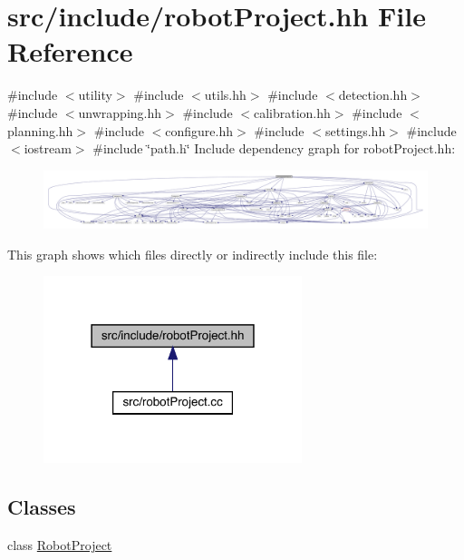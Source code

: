 \hypertarget{robot_project_8hh}{}\section{src/include/robot\+Project.hh File Reference}
\label{robot_project_8hh}
{\ttfamily \#include $<$utility$>$}\newline
{\ttfamily \#include $<$utils.\+hh$>$}\newline
{\ttfamily \#include $<$detection.\+hh$>$}\newline
{\ttfamily \#include $<$unwrapping.\+hh$>$}\newline
{\ttfamily \#include $<$calibration.\+hh$>$}\newline
{\ttfamily \#include $<$planning.\+hh$>$}\newline
{\ttfamily \#include $<$configure.\+hh$>$}\newline
{\ttfamily \#include $<$settings.\+hh$>$}\newline
{\ttfamily \#include $<$iostream$>$}\newline
{\ttfamily \#include \char`\"{}path.\+h\char`\"{}}\newline
Include dependency graph for robot\+Project.\+hh\+:
\nopagebreak
\begin{figure}[H]
\begin{center}
\leavevmode
\includegraphics[width=350pt]{robot_project_8hh__incl}
\end{center}
\end{figure}
This graph shows which files directly or indirectly include this file\+:
\nopagebreak
\begin{figure}[H]
\begin{center}
\leavevmode
\includegraphics[width=214pt]{robot_project_8hh__dep__incl}
\end{center}
\end{figure}
\subsection*{Classes}
\begin{DoxyCompactItemize}
\item 
class \mbox{\hyperlink{class_robot_project}{Robot\+Project}}
\end{DoxyCompactItemize}
